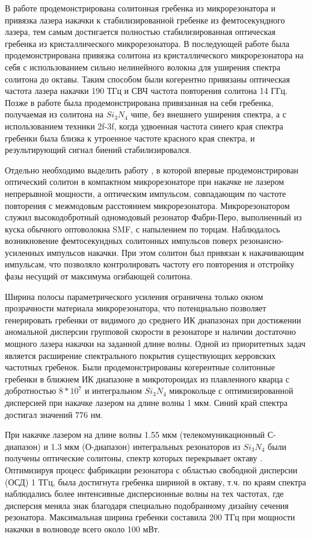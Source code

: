 В работе \cite{Jost2015} продемонстрирована солитонная гребенка из микрорезонатора и привязка лазера накачки к стабилизированной гребенке из фемтосекундного лазера, тем самым достигается полностью стабилизированная оптическая гребенка из кристаллического микрорезонатора. В последующей работе \cite{Jost:15} была продемонстрирована привязка солитона из кристаллического микрорезонатора на себя с использованием сильно нелинейного волокна для уширения спектра солитона до октавы. Таким способом были когерентно привязаны оптическая частота лазера накачки 190 ТГц и СВЧ частота повторения солитона 14 ГГц. Позже в работе \cite{Brasch2017} была продемонстрирована привязанная на себя гребенка, получаемая из солитона на $Si_3N_4$ чипе, без внешнего уширения спектра, а с использованием техники 2f-3f, когда удвоенная частота синего края спектра гребенки была близка к утроенное частоте красного края спектра, и результирующий сигнал биений стабилизировался.

Отдельно необходимо выделить работу \cite{Obrzud2017}, в которой впервые продемонстрирован оптический солитон в компактном микрорезонаторе при накачке не лазером непрерывной мощности, а оптическим импульсом, совпадающим по частоте повторения с межмодовым расстоянием микрорезонатора. Микрорезонатором служил высокодобротный одномодовый резонатор Фабри-Перо, выполненный из куска обычного оптоволокна SMF, с напылением по торцам. Наблюдалось возникновение фемтосекундных солитонных импульсов поверх резонансно-усиленных импульсов накачки. При этом солитон был привязан к накачивающим импульсам, что позволяло контролировать частоту его повторения и отстройку фазы несущий от максимума огибающей солитона.

Ширина полосы параметрического усиления ограничена только окном прозрачности материала микрорезонатора, что потенциально позволяет генерировать гребенки от видимого до среднего ИК диапазонах при достижении аномальной дисперсии групповой скорости в резонаторе и наличии достаточно мощного лазера накачки на заданной длине волны. Одной из приоритетных задач является расширение спектрального покрытия существующих керровских частотных гребенок. Были продемонстрированы когерентные солитонные гребенки в ближнем ИК диапазоне в микротороидах из плавленного кварца с добротностью $8*10^7$ \cite{Lee2017} и интегральном $Si_3N_4$ микрокольце с оптимизированной дисперсией \cite{Karpov2018} при накачке лазером на длине волны 1 мкм. Синий край спектра достигал значений $776$ нм.

При накачке лазером на длине волны 1.55 мкм (телекомуникационный С-диапазон) и 1.3 мкм (О-диапазон) интегральных резонаторов из $Si_3N_4$ были получены оптические солитоны, спектр которых перекрывает октаву \cite{Li:17,Pfeiffer:17}. Оптимизируя процесс фабрикации резонатора с областью свободной дисперсии (ОСД) 1 ТГц, была достигнута гребенка шириной в октаву, т.ч. по краям спектра наблюдались более интенсивные дисперсионные волны на тех частотах, где дисперсия меняла знак благодаря специально подобранному дизайну сечения резонатора. Максимальная ширина гребенки составила 200 ТГц при мощности накачки в волноводе всего около 100 мВт.


